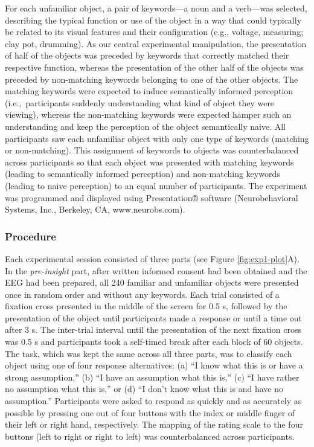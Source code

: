\documentclass[
  english,
  man,floatsintext]{apa7}
\begin{document}
For each unfamiliar object, a pair of keywords---a noun and a verb---was selected, describing the typical function or use of the object in a way that could typically be related to its visual features and their configuration (e.g., voltage, measuring; clay pot, drumming). As our central experimental manipulation, the presentation of half of the objects was preceded by keywords that correctly matched their respective function, whereas the presentation of the other half of the objects was preceded by non-matching keywords belonging to one of the other objects. The matching keywords were expected to induce semantically informed perception (i.e.,~participants suddenly understanding what kind of object they were viewing), whereas the non-matching keywords were expected hamper such an understanding and keep the perception of the object semantically naive. All participants saw each unfamiliar object with only one type of keywords (matching or non-matching). This assignment of keywords to objects was counterbalanced across participants so that each object was presented with matching keywords (leading to semantically informed perception) and non-matching keywords (leading to naive perception) to an equal number of participants. The experiment was programmed and displayed using Presentation® software (Neurobehavioral Systems, Inc., Berkeley, CA, www.neurobs.com).

\hypertarget{procedure}{%
\subsubsection{Procedure}\label{procedure}}

Each experimental session consisted of three parts (see Figure \ref{fig:exp1-plot}A). In the \emph{pre-insight} part, after written informed consent had been obtained and the EEG had been prepared, all 240 familiar and unfamiliar objects were presented once in random order and without any keywords. Each trial consisted of a fixation cross presented in the middle of the screen for 0.5 s, followed by the presentation of the object until participants made a response or until a time out after 3 s. The inter-trial interval until the presentation of the next fixation cross was 0.5 s and participants took a self-timed break after each block of 60 objects. The task, which was kept the same across all three parts, was to classify each object using one of four response alternatives: (a) ``I know what this is or have a strong assumption,'' (b) ``I have an assumption what this is,'' (c) ``I have rather no assumption what this is,'' or (d) ``I don't know what this is and have no assumption.'' Participants were asked to respond as quickly and as accurately as possible by pressing one out of four buttons with the index or middle finger of their left or right hand, respectively. The mapping of the rating scale to the four buttons (left to right or right to left) was counterbalanced across participants.
\end{document}
